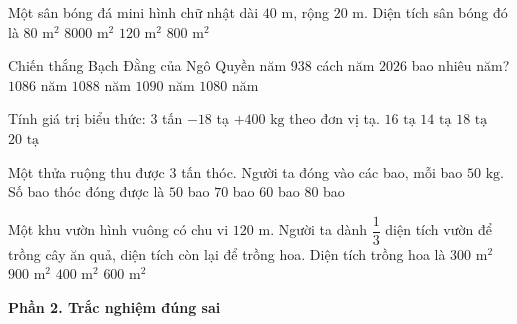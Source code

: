 \begin{ex} %
Một sân bóng đá mini hình chữ nhật dài $40\text{ m}$, rộng $20\text{ m}$. Diện tích sân bóng đó là
\choice
{$80\text{ m}^2$}
{$8000\text{ m}^2$}
{$120\text{ m}^2$}
{\True $800\text{ m}^2$}
\end{ex}

\begin{ex} %
Chiến thắng Bạch Đằng của Ngô Quyền năm $938$ cách năm $2026$ bao nhiêu năm?
\choice
{$1086$ năm}
{\True $1088$ năm}
{$1090$ năm}
{$1080$ năm}
\end{ex}

\begin{ex} %
Tính giá trị biểu thức: $3$ tấn $- 18$ tạ $+ 400\text{ kg}$ theo đơn vị tạ.
\choice
{\True $16\text{ tạ}$}
{$14\text{ tạ}$}
{$18\text{ tạ}$}
{$20\text{ tạ}$}
\end{ex}

\begin{ex} %
Một thửa ruộng thu được $3$ tấn thóc. Người ta đóng vào các bao, mỗi bao $50\text{ kg}$. Số bao thóc đóng được là
\choice
{$50$ bao}
{$70$ bao}
{\True $60$ bao}
{$80$ bao}
\end{ex}

\begin{ex} %
Một khu vườn hình vuông có chu vi $120\text{ m}$. Người ta dành $\dfrac{1}{3}$ diện tích vườn để trồng cây ăn quả, diện tích còn lại để trồng hoa. Diện tích trồng hoa là
\choice
{$300\text{ m}^2$}
{$900\text{ m}^2$}
{$400\text{ m}^2$}
{\True $600\text{ m}^2$}
\end{ex}

\textbf{Phần 2. Trắc nghiệm đúng sai}

